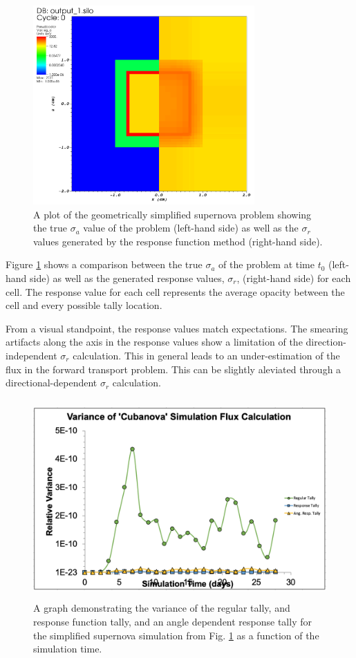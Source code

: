 \begin{figure} [h!]
	\centering
	\includegraphics[height=3in]{VarReduction/plots/cubanova_op_a.png}
	\caption{A plot of the geometrically simplified supernova problem showing the true $\sigma_{a}$ value of the problem (left-hand side) as well as the $\sigma_{r}$ values generated by the response function method (right-hand side).}
	\label{fig:cubanova_op_a}
\end{figure}

Figure \ref{fig:cubanova_op_a} shows a comparison between the true $\sigma_{a}$ of the problem at time $t_{0}$ (left-hand side) as well as the generated response values, $\sigma_{r}$, (right-hand side) for each cell. The response value for each cell represents the average opacity between the cell and every possible tally location. 

From a visual standpoint, the response values match expectations. The smearing artifacts along the axis in the response values show a limitation of the direction-independent $\sigma_{r}$ calculation. This in general leads to an under-estimation of the flux in the forward transport problem. This can be slightly aleviated through a directional-dependent $\sigma_{r}$ calculation.

\begin{figure} [h!]
	\centering
	\includegraphics[height=3in]{VarReduction/plots/cubanova_flux_var.png}
	\caption{A graph demonstrating the variance of the regular tally, and response function tally, and an angle dependent response tally for the simplified supernova simulation from Fig. \ref{fig:cubanova_op_a} as a function of the simulation time.}
	\label{fig:cubanova_flux_var}
\end{figure}

